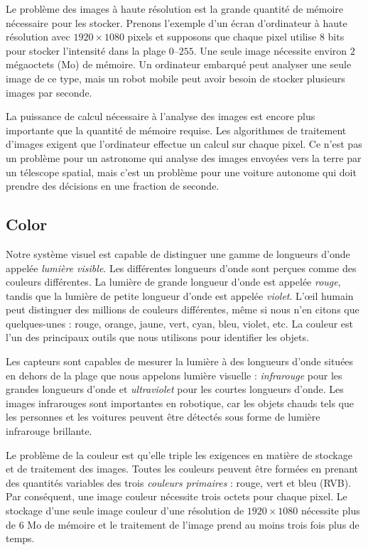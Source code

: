 Le problème des images à haute résolution est la grande quantité de mémoire nécessaire pour les stocker. Prenons l'exemple d'un écran d'ordinateur à haute résolution avec $1920 \times 1080$ pixels et supposons que chaque pixel utilise $8$ bits pour stocker l'intensité dans la plage $0$--$255$. Une seule image nécessite environ $2$ mégaoctets (Mo) de mémoire. Un ordinateur embarqué peut analyser une seule image de ce type, mais un robot mobile peut avoir besoin de stocker plusieurs images par seconde.

La puissance de calcul nécessaire à l'analyse des images est encore plus importante que la quantité de mémoire requise. Les algorithmes de traitement d'images exigent que l'ordinateur effectue un calcul sur chaque pixel. Ce n'est pas un problème pour un astronome qui analyse des images envoyées vers la terre par un télescope spatial, mais c'est un problème pour une voiture autonome qui doit prendre des décisions en une fraction de seconde.

\subsection*{Color}

Notre système visuel est capable de distinguer une gamme de longueurs d'onde appelée \emph{lumière visible}. Les différentes longueurs d'onde sont perçues comme des couleurs différentes. La lumière de grande longueur d'onde est appelée \emph{rouge}, tandis que la lumière de petite longueur d'onde est appelée \emph{violet}. L'œil humain peut distinguer des millions de couleurs différentes, même si nous n'en citons que quelques-unes : rouge, orange, jaune, vert, cyan, bleu, violet, etc. La couleur est l'un des principaux outils que nous utilisons pour identifier les objets.

Les capteurs sont capables de mesurer la lumière à des longueurs d'onde situées en dehors de la plage que nous appelons lumière visuelle : \emph{infrarouge} pour les grandes longueurs d'onde et \emph{ultraviolet} pour les courtes longueurs d'onde. Les images infrarouges sont importantes en robotique, car les objets chauds tels que les personnes et les voitures peuvent être détectés sous forme de lumière infrarouge brillante.

Le problème de la couleur est qu'elle triple les exigences en matière de stockage et de traitement des images. Toutes les couleurs peuvent être formées en prenant des quantités variables des trois \emph{couleurs primaires} : rouge, vert et bleu (RVB). Par conséquent, une image couleur nécessite trois octets pour chaque pixel. Le stockage d'une seule image couleur d'une résolution de $1920 \times 1080$ nécessite plus de $6$ Mo de mémoire et le traitement de l'image prend au moins trois fois plus de temps.

